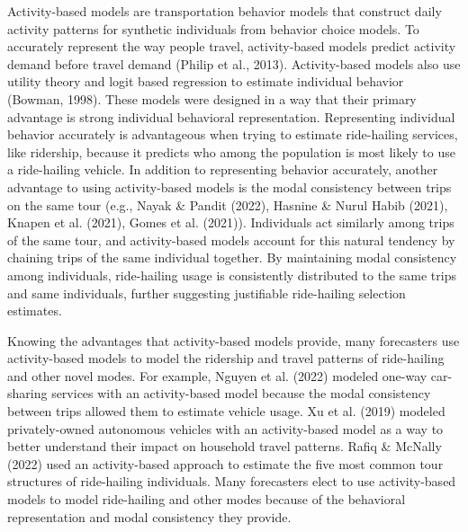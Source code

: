 \documentclass[fancy, masters]{byuthesis}
\begin{document}
Activity-based models are transportation behavior models that construct daily activity patterns for synthetic individuals from behavior choice models. To accurately represent the way people travel, activity-based models predict activity demand before travel demand (Philip et al., 2013). Activity-based models also use utility theory and logit based regression to estimate individual behavior (Bowman, 1998). These models were designed in a way that their primary advantage is strong individual behavioral representation. Representing individual behavior accurately is advantageous when trying to estimate ride-hailing services, like ridership, because it predicts who among the population is most likely to use a ride-hailing vehicle. In addition to representing behavior accurately, another advantage to using activity-based models is the modal consistency between trips on the same tour (e.g., Nayak \& Pandit (2022), Hasnine \& Nurul Habib (2021), Knapen et al. (2021), Gomes et al. (2021)). Individuals act similarly among trips of the same tour, and activity-based models account for this natural tendency by chaining trips of the same individual together. By maintaining modal consistency among individuals, ride-hailing usage is consistently distributed to the same trips and same individuals, further suggesting justifiable ride-hailing selection estimates.

Knowing the advantages that activity-based models provide, many forecasters use activity-based models to model the ridership and travel patterns of ride-hailing and other novel modes. For example, Nguyen et al. (2022) modeled one-way car-sharing services with an activity-based model because the modal consistency between trips allowed them to estimate vehicle usage. Xu et al. (2019) modeled privately-owned autonomous vehicles with an activity-based model as a way to better understand their impact on household travel patterns. Rafiq \& McNally (2022) used an activity-based approach to estimate the five most common tour structures of ride-hailing individuals. Many forecasters elect to use activity-based models to model ride-hailing and other modes because of the behavioral representation and modal consistency they provide.
\end{document}
